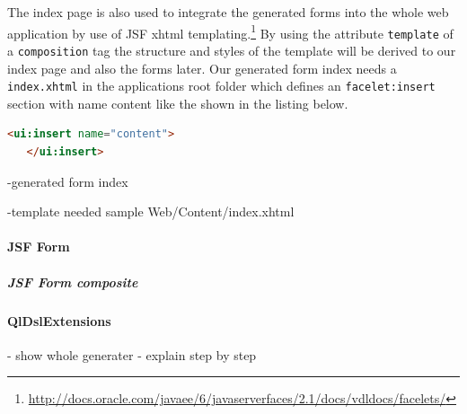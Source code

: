 The index page is also used to integrate the generated forms into the whole web
application by use of JSF xhtml
templating.\footnote{\url{http://docs.oracle.com/javaee/6/javaserverfaces/2.1/docs/vdldocs/facelets/}}
By using the attribute \texttt{template} of a \texttt{composition} tag the
structure and styles of the template will be derived to our index page and also
the forms later. Our generated form index needs a \texttt{index.xhtml} in the
applications root folder which defines an \texttt{facelet:insert} section
with name content like the shown in the listing below.

 \begin{lstlisting}[language=HTML] 
   <ui:insert name="content">
   </ui:insert>
  \end{lstlisting}
 
-generated form index

-template needed sample Web/Content/index.xhtml

\paragraph{JSF Form}

\subparagraph{JSF Form composite}

\paragraph{QlDslExtensions} 
- show whole generater
- explain step by step